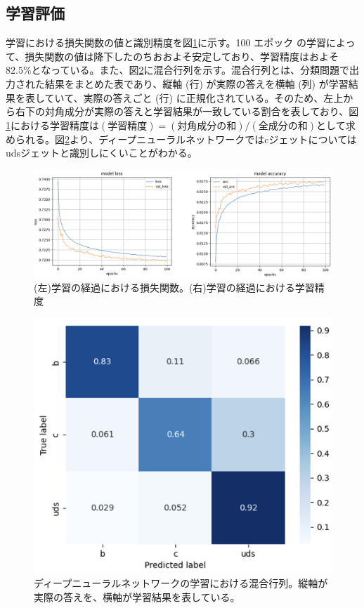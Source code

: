 \subsection{学習評価}
学習における損失関数の値と識別精度を図\ref{dnnoutput}に示す。100 エポック の学習によって、損失関数の値は降下したのちおおよそ安定しており、学習精度はおよそ$82.5\%$となっている。また、図\ref{dnncm}に混合行列を示す。混合行列とは、分類問題で出力された結果をまとめた表であり、縦軸 (行) が実際の答えを横軸 (列) が学習結果を表していて、実際の答えごと (行) に正規化されている。そのため、左上から右下の対角成分が実際の答えと学習結果が一致している割合を表しており、図\ref{dnnoutput}における学習精度は$(学習精度) = (対角成分の和) / (全成分の和)$として求められる。図\ref{dnncm}より、ディープニューラルネットワークではcジェットについてはudsジェットと識別しにくいことがわかる。\\
\begin{figure}[H]
	\begin{center}
 \includegraphics[keepaspectratio, scale=0.3]
 	{Figure/Flavortagging/dnnout.png}
 		\caption{(左)学習の経過における損失関数。(右)学習の経過における学習精度}
 		\label{dnnoutput}
	\end{center}
\end{figure}
\begin{figure}[H]
	\begin{center}
 \includegraphics[keepaspectratio, scale=0.2]
 	{Figure/Flavortagging/dnncm.png}
 		\caption{ディープニューラルネットワークの学習における混合行列。縦軸が実際の答えを、横軸が学習結果を表している。}
 		\label{dnncm}
	\end{center}
\end{figure}
